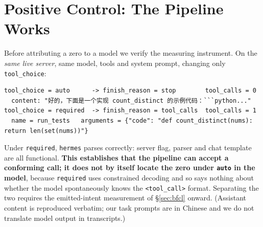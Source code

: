 \section{Positive Control: The Pipeline Works}
\label{sec:control}

Before attributing a zero to a model we verify the measuring instrument. On the \emph{same
live server}, same model, tools and system prompt, changing only \texttt{tool\_choice}:

{\footnotesize
\begin{verbatim}
tool_choice = auto      -> finish_reason = stop        tool_calls = 0
  content: "好的，下面是一个实现 count_distinct 的示例代码：```python..."
tool_choice = required  -> finish_reason = tool_calls  tool_calls = 1
  name = run_tests   arguments = {"code": "def count_distinct(nums): return len(set(nums))"}
\end{verbatim}
}

\noindent Under \texttt{required}, \texttt{hermes} parses correctly: server flag, parser and
chat template are all functional. \textbf{This establishes that the pipeline can accept a
conforming call; it does not by itself locate the zero under \texttt{auto} in the model},
because \texttt{required} uses constrained decoding and so says nothing about whether the
model spontaneously knows the \texttt{<tool\_call>} format. Separating the two requires the
emitted-intent measurement of \S\ref{sec:bfcl} onward. (Assistant content is reproduced
verbatim; our task prompts are in Chinese and we do not translate model output in
transcripts.)
